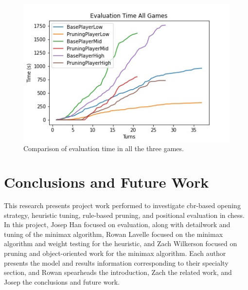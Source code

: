 \documentclass[letterpaper]{article}
\begin{document}
\begin{figure}
    \center

    \includegraphics[scale = 0.9]{all_game_time.jpg}
  
    \caption{Comparison of evaluation time in all the three games.} 
\end{figure}
\section{Conclusions and Future Work}
This research presents project work performed to investigate \acrshort{cbr}-based opening strategy, heuristic tuning, rule-based pruning, and positional evaluation in chess.  In this project, Josep Han focused on evaluation, along with detailwork and tuning of the minimax algorithm, Rowan Lavelle focused on the minimax algorithm and weight testing for the heuristic, and Zach Wilkerson focused on pruning and object-oriented work for the minimax algorithm.  Each author presents the model and results information corresponding to their specialty section, and Rowan spearheads the introduction, Zach the related work, and Josep the conclusions and future work.
\end{document}
